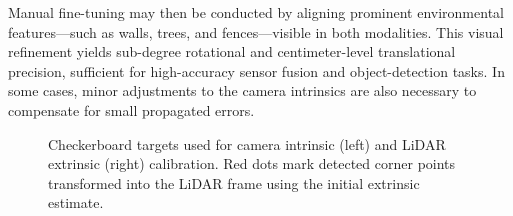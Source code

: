 \documentclass{erauthesis}
\begin{document}
Manual fine-tuning may then be conducted by aligning prominent environmental features—such as walls, trees, and fences—visible in both modalities.  
This visual refinement yields sub-degree rotational and centimeter-level translational precision, sufficient for high-accuracy sensor fusion and object-detection tasks.  
In some cases, minor adjustments to the camera intrinsics are also necessary to compensate for small propagated errors.

\begin{figure}[htbp]
\centering
{}
\caption{Checkerboard targets used for camera intrinsic (left) and LiDAR extrinsic (right) calibration. Red dots mark detected corner points transformed into the LiDAR frame using the initial extrinsic estimate.}
\label{fig:camLidar_calib}
\end{figure}
\end{document}
